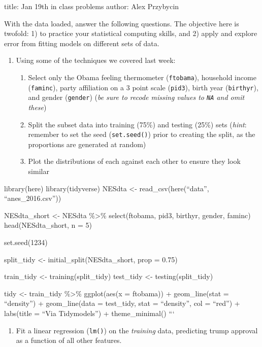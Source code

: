 \documentclass[
]{article}
\author{}
\date{\vspace{-2.5em}}
\providecommand{\tightlist}{%
  \setlength{\itemsep}{0pt}\setlength{\parskip}{0pt}}
\begin{document}
title: Jan 19th in class problems author: Alex Przybycin

With the data loaded, answer the following questions. The objective here
is twofold: 1) to practice your statistical computing skills, and 2)
apply and explore error from fitting models on different sets of data.

\begin{enumerate}
\def\labelenumi{\arabic{enumi}.}
\item
  Using some of the techniques we covered last week:

  \begin{enumerate}
  \def\labelenumii{\alph{enumii}.}
  \item
    Select only the Obama feeling thermometer (\texttt{ftobama}),
    household income (\texttt{faminc}), party affiliation on a 3 point
    scale (\texttt{pid3}), birth year (\texttt{birthyr}), and gender
    (\texttt{gender}) (\emph{be sure to recode missing values to
    \texttt{NA} and omit these})
  \item
    Split the subset data into training (75\%) and testing (25\%) sets
    (\emph{hint}: remember to set the seed (\texttt{set.seed()}) prior
    to creating the split, as the proportions are generated at random)
  \item
    Plot the distributions of each against each other to ensure they
    look similar
  \end{enumerate}
\end{enumerate}

library(here) library(tidyverse) NESdta \textless-
read\_csv(here(``data'', ``anes\_2016.csv''))

NESdta\_short \textless- NESdta \%\textgreater\% select(ftobama, pid3,
birthyr, gender, faminc) head(NESdta\_short, n = 5)

set.seed(1234)

split\_tidy \textless- initial\_split(NESdta\_short, prop = 0.75)

train\_tidy \textless- training(split\_tidy) test\_tidy \textless-
testing(split\_tidy)

tidy \textless- train\_tidy \%\textgreater\% ggplot(aes(x = ftobama)) +
geom\_line(stat = ``density'') + geom\_line(data = test\_tidy, stat =
``density'', col = ``red'') + labs(title = ``Via Tidymodels'') +
theme\_minimal() ```

\begin{enumerate}
\def\labelenumi{\arabic{enumi}.}
\setcounter{enumi}{1}
\tightlist
\item
  Fit a linear regression (\texttt{lm()}) on the \emph{training} data,
  predicting trump approval as a function of all other features.
\end{enumerate}
\end{document}
